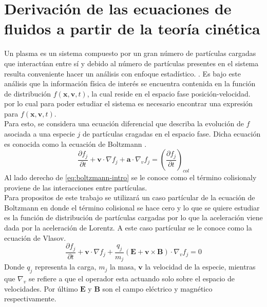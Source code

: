 \documentclass[../tesis_main_file.tex]{subfiles}
\begin{document}
\section{Derivación de las ecuaciones de fluidos a partir de la teoría cinética}
Un plasma es un sistema compuesto por un gran número de partículas cargadas que interactúan entre sí y debido al número de partículas presentes en el sistema resulta conveniente hacer un análisis con enfoque estadístico.  \cite{bittencourt2013fundamentals}.
Es bajo este análisis que la información física de interés se encuentra contenida en la función de distribución $f(\textbf{x},\textbf{v},t)$, la cual reside en el espacio fase posición-velocidad. por lo cual para poder estudiar el sistema es necesario encontrar una expresión para $f(\textbf{x},\textbf{v},t)$.\\
Para esto, se considera una ecuación diferencial que describa la evolución de $f$ asociada a una especie $j$ de partículas cragadas en el espacio fase.
 Dicha ecuación es conocida como la ecuación de Boltzmann \cite{jardin2010computational} .
\begin{equation}
\label{eq:boltzmann-intro}
\frac{\partial f_j}{\partial t}+ \textbf{v}\cdot \nabla f_j + \textbf{a}\cdot \nabla _v f_j=\left(\frac{\partial f_j}{\partial t}\right)_{col}
\end{equation}
Al lado derecho  de \ref{eq:boltzmann-intro} se le conoce como el término colisionaly proviene de las interacciones entre partículas.\\
Para propositos de este trabajo se utilizará un caso partícular de la ecuación de Boltzmann en donde el término colisional se hace cero y lo que se quiere estudiar es la función de distribución de partículas cargadas por lo que la aceleración viene dada por la aceleración de Lorentz. A este caso partícular se le conoce como la ecuación de Vlasov.
\begin{equation}
\label{eq:boltzmann-vlasov-intro}
\frac{\partial f_j}{\partial t}+ \textbf{v}\cdot \nabla f_j + \frac{q_j}{m_j}\left( \textbf{E} + \textbf{v} \times \textbf{B}\right)\cdot \nabla _v f_j=0
\end{equation}
Donde $q_j$ representa la carga, $m_j$ la masa, $\textbf{v}$ la velocidad de la especie, mientras que $\nabla _v$ se refiere a que el operador esta actuando solo sobre el espacio de velocidades. Por último $\textbf{E}$ y $\textbf{B}$ son el campo eléctrico y magnético respectivamente.\\
\end{document}
